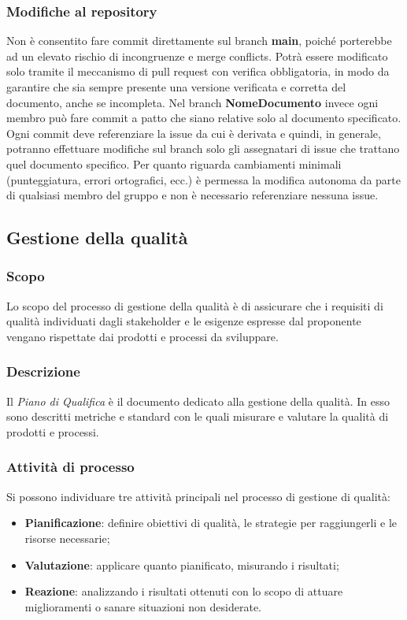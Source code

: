 \subsubsection{Modifiche al repository}
Non è consentito fare commit direttamente sul branch \textbf{main}, poiché porterebbe ad un elevato rischio di incongruenze e merge conflicts. Potrà essere modificato solo tramite il meccanismo di pull request con verifica obbligatoria, in modo da garantire che sia sempre presente una versione verificata e corretta del documento, anche se incompleta.
Nel branch \textbf{NomeDocumento} invece ogni membro può fare commit a patto che siano relative solo al documento specificato. Ogni commit deve referenziare la issue da cui è derivata e quindi, in generale, potranno effettuare modifiche sul branch solo gli assegnatari di issue che trattano quel documento specifico. Per quanto riguarda cambiamenti minimali (punteggiatura, errori ortografici, ecc.) è permessa la modifica autonoma da parte di qualsiasi membro del gruppo e non è necessario referenziare nessuna issue.

\subsection{Gestione della qualità}
\subsubsection{Scopo}
Lo scopo del processo di gestione della qualità è di assicurare che i requisiti di qualità individuati dagli stakeholder e le esigenze espresse dal proponente vengano rispettate dai prodotti e processi da sviluppare.

\subsubsection{Descrizione}
Il \textit{Piano di Qualifica} è il documento dedicato alla gestione della qualità. In esso sono descritti metriche e standard con le quali misurare e valutare la qualità di prodotti e processi.  

\subsubsection{Attività di processo}
Si possono individuare tre attività principali nel processo di gestione di qualità:
\begin{itemize}
\item \textbf{Pianificazione}: definire obiettivi di qualità, le strategie per raggiungerli e le risorse necessarie; 
\item \textbf{Valutazione}: applicare quanto pianificato, misurando i risultati;
\item \textbf{Reazione}: analizzando i risultati ottenuti con lo scopo di attuare miglioramenti o sanare situazioni non desiderate.
\end{itemize}

